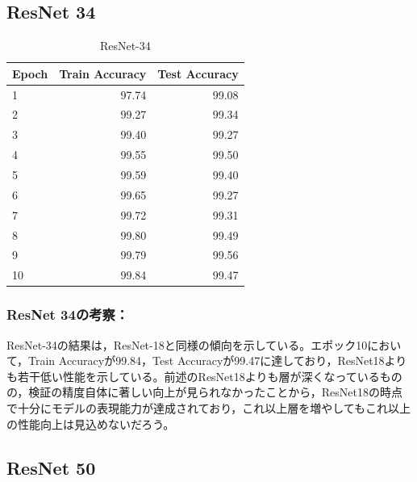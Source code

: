 \documentclass[a4paper,11pt,titlepage]{jsarticle}
\begin{document}
\subsection{ResNet 34}
\begin{table}[h]
\centering
\caption{ResNet-34}
\label{tab:ResNet34}
\begin{tabular}{lrr}
\hline
 Epoch &  Train Accuracy &  Test Accuracy \\
\hline
     1 &           97.74 &                99.08 \\
     2 &           99.27 &                99.34 \\
     3 &           99.40 &                99.27 \\
     4 &           99.55 &                99.50 \\
     5 &           99.59 &                99.40 \\
     6 &           99.65 &                99.27 \\
     7 &           99.72 &                99.31 \\
     8 &           99.80 &                99.49 \\
     9 &           99.79 &                99.56 \\
    10 &           99.84 &                99.47 \\
\hline
\end{tabular}
\end{table}

\subsubsection*{ResNet 34の考察：}
ResNet-34の結果は，ResNet-18と同様の傾向を示している。エポック10において，Train Accuracyが99.84，Test Accuracyが99.47に達しており，ResNet18よりも若干低い性能を示している。前述のResNet18よりも層が深くなっているものの，検証の精度自体に著しい向上が見られなかったことから，ResNet18の時点で十分にモデルの表現能力が達成されており，これ以上層を増やしてもこれ以上の性能向上は見込めないだろう。

\subsection{ResNet 50}
\end{document}

